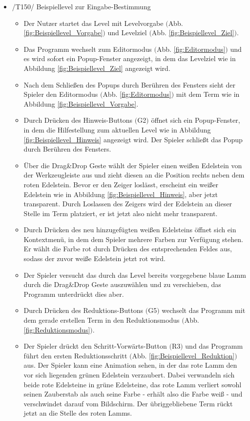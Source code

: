 \begin{itemize}
\item /T150/ Beispiellevel zur Eingabe-Bestimmung
\begin{itemize}
\item Der Nutzer startet das Level mit Levelvorgabe $($Abb. \ref{fig:Beispiellevel_Vorgabe}$)$ und Levelziel $($Abb. \ref{fig:Beispiellevel_Ziel}$)$.
\item Das Programm wechselt zum Editormodus $($Abb. \ref{fig:Editormodus}$)$ und es wird sofort ein Popup-Fenster angezeigt, in dem das Levelziel wie in Abbildung \ref{fig:Beispiellevel_Ziel} angezeigt wird.
\item Nach dem Schließen des Popups durch Berühren des Fensters sieht der Spieler den Editormodus $($Abb. \ref{fig:Editormodus}$)$ mit dem Term wie in Abbildung \ref{fig:Beispiellevel_Vorgabe}.
\item Durch Drücken des Hinweis-Buttons $($G2$)$ öffnet sich ein Popup-Fenster, in dem die Hilfestellung zum aktuellen Level wie in Abbildung \ref{fig:Beispiellevel_Hinweis} angezeigt wird. Der Spieler schließt das Popup durch Berühren des Fensters.
\item Über die Drag\&Drop Geste wählt der Spieler einen weißen Edelstein von der Werkzeugleiste aus und zieht diesen an die Position rechts neben dem roten Edelstein. Bevor er den Zeiger loslässt, erscheint ein weißer Edelstein wie in Abbildung \ref{fig:Beispiellevel_Hinweis}, aber jetzt transparent. Durch Loslassen des Zeigers wird der Edelstein an dieser Stelle im Term platziert, er ist jetzt also nicht mehr transparent.
\item Durch Drücken des neu hinzugefügten weißen Edelsteins öffnet sich ein Kontextmenü, in dem dem Spieler mehrere Farben zur Verfügung stehen. Er wählt die Farbe rot durch Drücken des entsprechenden Feldes aus, sodass der zuvor weiße Edelstein jetzt rot wird.
\item Der Spieler versucht das durch das Level bereits vorgegebene blaue Lamm durch die Drag\&Drop Geste auszuwählen und zu verschieben, das Programm unterdrückt dies aber.
\item Durch Drücken des Reduktions-Buttons $($G5$)$ wechselt das Programm mit dem gerade erstellen Term in den Reduktionsmodus $($Abb. \ref{fig:Reduktionsmodus}$)$.
\item Der Spieler drückt den Schritt-Vorwärts-Button $($R3$)$ und das Programm führt den ersten Reduktionsschritt $($Abb. \ref{fig:Beispiellevel_Reduktion}$)$ aus. Der Spieler kann eine Animation sehen, in der das rote Lamm den vor sich liegenden grünen Edelstein verzaubert. Dabei verwandeln sich beide rote Edelsteine in grüne Edelsteine, das rote Lamm verliert sowohl seinen Zauberstab als auch seine Farbe - erhält also die Farbe weiß - und verschwindet darauf vom Bildschirm. Der übriggebliebene Term rückt jetzt an die Stelle des roten Lamms.

\end{itemize}
\end{itemize}
